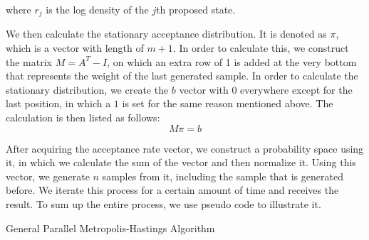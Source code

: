 where $r_j$ is the log density of the $j$th proposed state.

We then calculate the stationary acceptance distribution. It is denoted as $\pi$, which is a vector with length of $m+1$. In order to calculate this, we construct the matrix $M = A^T - I$, on which an extra row of 1 is added at the very bottom that represents the weight of the last generated sample. In order to calculate the stationary distribution, we create the $b$ vector with $0$ everywhere except for the last position, in which a $1$ is set for the same reason mentioned above.\cite{gpmh_derivation} The calculation is then listed as follows:
\begin{equation}
M\pi = b
\end{equation}

After acquiring the acceptance rate vector, we construct a probability space using it, in which we calculate the sum of the vector and then normalize it. Using this vector, we generate $n$ samples from it, including the sample that is generated before. We iterate this process for a certain amount of time and receives the result. To sum up the entire process, we use pseudo code to illustrate it.
\\


\begin{algorithm}[H]
\BlankLine


\caption{General Parallel Metropolis-Hastings Algorithm}
\end{algorithm}


